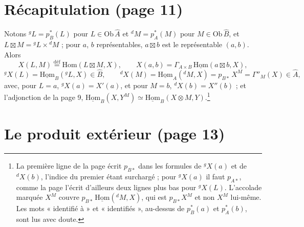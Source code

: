 \documentclass[11pt,a4paper]{article}
\begin{document}
\section*{Récapitulation (page 11)}

Notons ${}^{g}L = p_{B}^{*}(L)$ pour $L \in \mathrm{Ob}\, \widehat{A}$ et
${}^{d}M = p_{A}^{*}(M)$ pour $M \in \mathrm{Ob}\, \widehat{B}$, et $L
\boxtimes M = {}^{g}L \times {}^{d}M$ ; pour $a$, $b$ représentables, $a
\boxtimes b$ est le représentable $(a, b)$. Alors
\[
X(L, M) \overset{\text{déf}}{=} \mathrm{Hom}(L \boxtimes M, X), \qquad X(a, b)
= \Gamma_{A \times B}\, \underline{\mathrm{Hom}}(a \boxtimes b, X),
\]
\[
{}^{g}X(L) = \underline{\mathrm{Hom}}_{B}({}^{g}L, X) \in \widehat{B}, \qquad
{}^{d}X(M) = \underline{\mathrm{Hom}}_{A}({}^{d}M, X) = p_{B*}\, X^{M} =
\Gamma''_{M}(X) \in \widehat{A},
\]
avec, pour $L = a$, ${}^{g}X(a) = X'(a)$, et pour $M = b$, ${}^{d}X(b) =
X''(b)$ ; et l'adjonction de la page 9, $\underline{\mathrm{Hom}}_{B}(X,
Y^{M}) \simeq \underline{\mathrm{Hom}}_{B}(X \otimes M, Y)$.\footnote{La
première ligne de la page écrit $p_{B*}$ dans les formules de ${}^{g}X(a)$ et
de ${}^{d}X(b)$, l'indice du premier étant surchargé ; pour ${}^{g}X(a)$ il
faut $p_{A*}$, comme la page l'écrit d'ailleurs deux lignes plus bas pour
${}^{g}X(L)$. L'accolade marquée $X^{M}$ couvre
$p_{B*}\,\underline{\mathrm{Hom}}({}^{d}M, X)$, qui est $p_{B*}X^{M}$ et non
$X^{M}$ lui-même. Les mots « identifié à » et « identifiés », au-dessus de
$p_{B}^{*}(a)$ et $p_{A}^{*}(b)$, sont lus avec doute.}

\section*{Le produit extérieur (page 13)}
\end{document}
